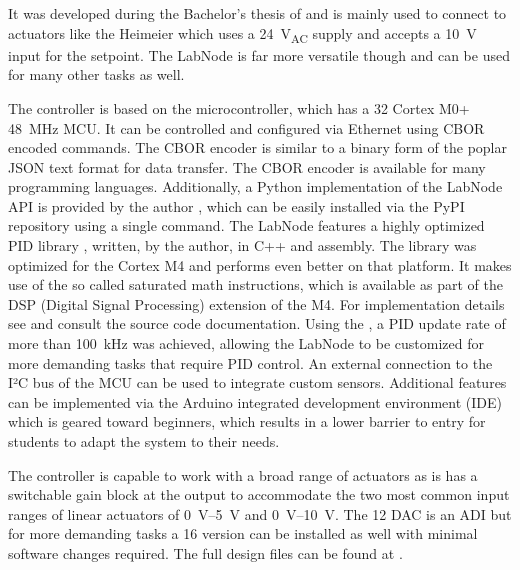 It was developed during the Bachelor’s thesis of \citeauthor{thesis_liebmann} \cite{thesis_liebmann} and is mainly used to connect to actuators like the Heimeier  \cite{datasheet_heimeier_emo_t} which uses a \qty{24}{\V_{AC}} supply and accepts a \qty{10}{\V} input for the setpoint. The LabNode is far more versatile though and can be used for many other tasks as well.

The controller is based on the  microcontroller, which has a \qty{32}{\bit} Cortex M0+ \qty{48}{\MHz} MCU. It can be controlled and configured via Ethernet using CBOR \cite{rfc_cbor} encoded commands. The CBOR encoder is similar to a binary form of the poplar JSON \cite{rfc_json} text format for data transfer. The CBOR encoder is available for many programming languages. Additionally, a Python implementation of the LabNode API is provided by the author \cite{git_labnode}, which can be easily installed via the PyPI repository using a single command. The LabNode features a highly optimized PID library \cite{git_pid}, written, by the author, in C++ and assembly. The library was optimized for the Cortex M4 and performs even better on that platform. It makes use of the so called saturated math instructions, which is available as part of the DSP (Digital Signal Processing) extension of the M4. For implementation details see \cite{git_pid} and consult the source code documentation. Using the , a PID update rate of more than \qty{100}{\kHz} was achieved, allowing the LabNode to be customized for more demanding tasks that require PID control. An external connection to the I²C bus of the MCU can be used to integrate custom sensors. Additional features can be implemented via the Arduino integrated development environment (IDE) which is geared toward beginners, which results in a lower barrier to entry for students to adapt the system to their needs.

The controller is capable to work with a broad range of actuators as is has a switchable gain block at the output to accommodate the two most common input ranges of linear actuators of \qtyrange[range-units = single, range-phrase={~to~}]{0}{5}{\V} and \qtyrange[range-units = single, range-phrase={~to~}]{0}{10}{\V}. The \qty{12}{\bit} DAC is an ADI  \cite{datasheet_AD5681R} but for more demanding tasks a \qty{16}{\bit} version  can be installed as well with minimal software changes required. The full design files can be found at \cite{git_labnode_kicad}.

